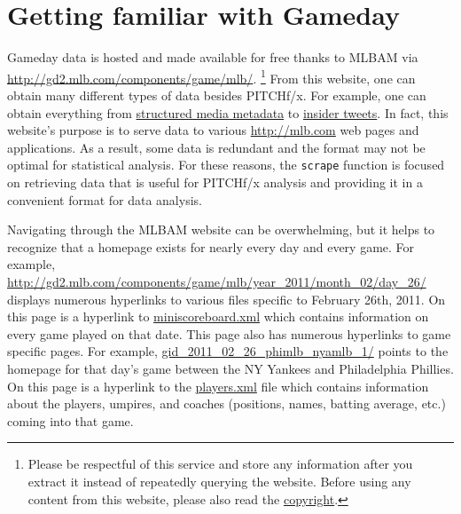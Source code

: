 \documentclass[12pt,]{isuthesis}
\let\rmarkdownfootnote\footnote%
\def\footnote{\protect\rmarkdownfootnote}
\begin{document}
\section{Getting familiar with
Gameday}\label{getting-familiar-with-gameday}

Gameday data is hosted and made available for free thanks to MLBAM via
\url{http://gd2.mlb.com/components/game/mlb/}.
\footnote{Please be respectful of this service and store any information after
you extract it instead of repeatedly querying the website. Before
using any content from this website, please also read the \href{http://gdx.mlb.com/components/copyright.txt}{copyright}.
} From this website, one can obtain many different types of data besides
PITCHf/x. For example, one can obtain everything from
\href{http://gd2.mlb.com/components/game/mlb/year_2013/month_07/day_16/gid_2013_07_16_aasmlb_nasmlb_1/media/instadium.xml}{structured media metadata}
to
\href{http://gd2.mlb.com/components/game/mlb/twitter/anaInsiderTweets.xml}{insider tweets}.
In fact, this website's purpose is to serve data to various
\url{http://mlb.com} web pages and applications. As a result, some data
is redundant and the format may not be optimal for statistical analysis.
For these reasons, the \texttt{scrape} function is focused on retrieving
data that is useful for PITCHf/x analysis and providing it in a
convenient format for data analysis.

Navigating through the MLBAM website can be overwhelming, but it helps
to recognize that a homepage exists for nearly every day and every game.
For example,
\url{http://gd2.mlb.com/components/game/mlb/year_2011/month_02/day_26/}
displays numerous hyperlinks to various files specific to February 26th,
2011. On this page is a hyperlink to
\href{http://gd2.mlb.com/components/game/mlb/year_2011/month_02/day_26/miniscoreboard.xml}{miniscoreboard.xml}
which contains information on every game played on that date. This page
also has numerous hyperlinks to game specific pages. For example,
\href{http://gd2.mlb.com/components/game/mlb/year_2011/month_02/day_26/gid_2011_02_26_phimlb_nyamlb_1/}{gid\_2011\_02\_26\_phimlb\_nyamlb\_1/}
points to the homepage for that day's game between the NY Yankees and
Philadelphia Phillies. On this page is a hyperlink to the
\href{http://gd2.mlb.com/components/game/mlb/year_2011/month_02/day_26/gid_2011_02_26_phimlb_nyamlb_1/players.xml}{players.xml}
file which contains information about the players, umpires, and coaches
(positions, names, batting average, etc.) coming into that game.
\end{document}
